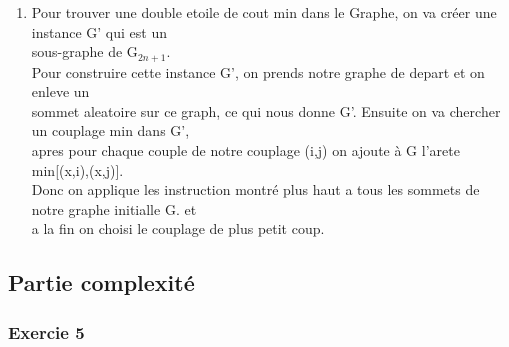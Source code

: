 \documentclass[]{article}
\begin{document}
\begin{enumerate}


\item Pour trouver une double etoile de cout min dans le Graphe, on va créer une instance G' qui est un \\
sous-graphe de G$_{2n+1}$.\\
Pour construire cette instance G', on prends notre graphe de depart et on enleve un\\
sommet aleatoire sur ce graph, ce qui nous donne G'. Ensuite on va chercher un couplage min dans G',\\
apres pour chaque couple de notre couplage (i,j) on ajoute à G l'arete min[(x,i),(x,j)]. \\
Donc on applique les instruction montré plus haut a tous les sommets de notre graphe initialle G. et \\
a la fin on choisi le couplage de plus petit coup.
\end{enumerate}


\subsection{Partie complexité}

\subsubsection{Exercie 5}
\end{document}
